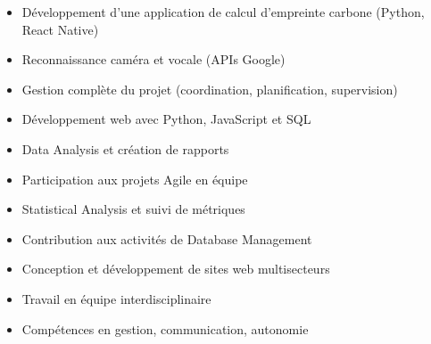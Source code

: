 \documentclass[10pt,a4paper,normalphoto]{altacv}
\begin{document}
\divider

\begin{itemize}
\item Développement d'une application de calcul d'empreinte carbone (Python, React Native)
\item Reconnaissance caméra et vocale (APIs Google)
\item Gestion complète du projet (coordination, planification, supervision)
\end{itemize}

\divider

\begin{itemize}
\item Développement web avec Python, JavaScript et SQL
\item Data Analysis et création de rapports
\item Participation aux projets Agile en équipe
\item Statistical Analysis et suivi de métriques
\item Contribution aux activités de Database Management
\end{itemize}

\divider

\begin{itemize}
\item Conception et développement de sites web multisecteurs
\item Travail en équipe interdisciplinaire
\item Compétences en gestion, communication, autonomie
\end{itemize}
\end{document}
